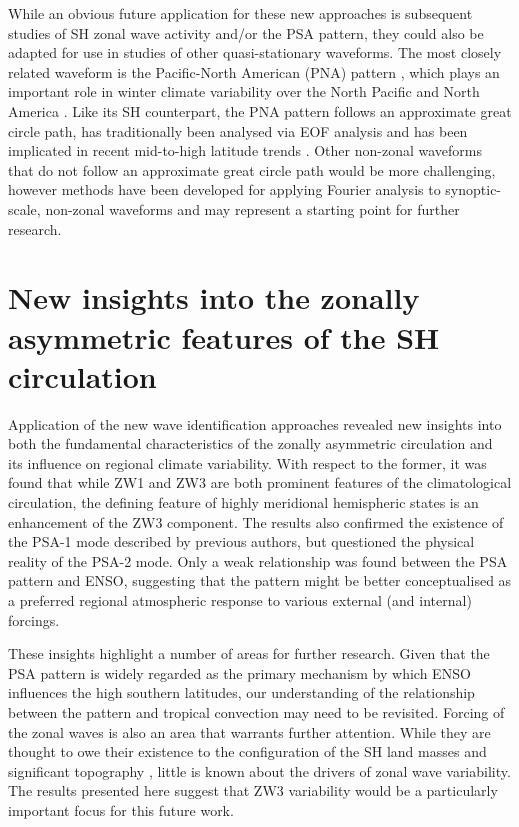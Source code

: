 While an obvious future application for these new approaches is subsequent studies of SH zonal wave activity and/or the PSA pattern, they could also be adapted for use in studies of other quasi-stationary waveforms. The most closely related waveform is the Pacific-North American (PNA) pattern \citep{Wallace1981}, which plays an important role in winter climate variability over the North Pacific and North America \citep[e.g.][]{Notaro2006}. Like its SH counterpart, the PNA pattern follows an approximate great circle path, has traditionally been analysed via EOF analysis and has been implicated in recent mid-to-high latitude trends \citep[e.g.][]{Ding2014,Liu2015}. Other non-zonal waveforms that do not follow an approximate great circle path would be more challenging, however methods have been developed for applying Fourier analysis to synoptic-scale, non-zonal waveforms \citep{Zimin2006,Souders2014} and may represent a starting point for further research. 



\section{New insights into the zonally asymmetric features of the SH circulation}

Application of the new wave identification approaches revealed new insights into both the fundamental characteristics of the zonally asymmetric circulation and its influence on regional climate variability. With respect to the former, it was found that while ZW1 and ZW3 are both prominent features of the climatological circulation, the defining feature of highly meridional hemispheric states is an enhancement of the ZW3 component. The results also confirmed the existence of the PSA-1 mode described by previous authors, but questioned the physical reality of the PSA-2 mode. Only a weak relationship was found between the PSA pattern and ENSO, suggesting that the pattern might be better conceptualised as a preferred regional atmospheric response to various external (and internal) forcings. 

These insights highlight a number of areas for further research. Given that the PSA pattern is widely regarded as the primary mechanism by which ENSO influences the high southern latitudes, our understanding of the relationship between the pattern and tropical convection may need to be revisited. Forcing of the zonal waves is also an area that warrants further attention. While they are thought to owe their existence to the configuration of the SH land masses and significant topography \citep{Baines1989}, little is known about the drivers of zonal wave variability. The results presented here suggest that ZW3 variability would be a particularly important focus for this future work.  


